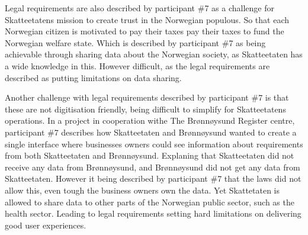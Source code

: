 
Legal requirements are also described by participant \#7 as a challenge for Skatteetatens mission to create trust in the Norwegian populous. So that each Norwegian citizen is motivated to pay their taxes pay their taxes to fund the Norwegian welfare state. Which is described by participant \#7 as being achievable through sharing data about the Norwegian society, as Skatteetaten has a wide knowledge in this. However difficult, as the legal requirements are described as putting limitations on data sharing.


Another challenge with legal requirements described by participant \#7 is that these are not digitisation friendly, being difficult to simplify for Skatteetatens operations. In a project in cooperation withe The Brønnøysund Register centre, participant \#7 describes how Skatteetaten and Brønnøysund wanted to create a single interface where businesses owners could see information about requirements from both Skatteetaten and Brønnøysund. Explaning that Skatteetaten did not receive any data from Brønnøysund, and Brønnøysund did not get any data from Skatteetaten. However it being described by participant \#7 that the laws did not allow this, even tough the business owners own the data. Yet Skattetaten is allowed to share data to other parts of the Norwegian public sector, such as the health sector. Leading to legal requirements setting hard limitations on delivering good user experiences.


